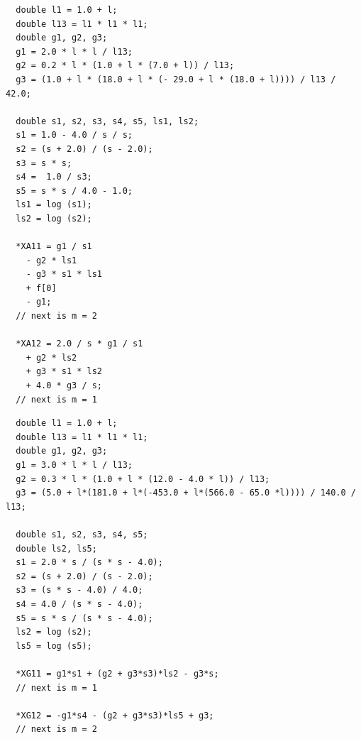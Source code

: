 \documentclass[12pt]{article}
\begin{document}
\begin{minipage}[cbt]{0.5\textwidth}
{\tiny
\begin{verbatim}
  double l1 = 1.0 + l;
  double l13 = l1 * l1 * l1;
  double g1, g2, g3;
  g1 = 2.0 * l * l / l13;
  g2 = 0.2 * l * (1.0 + l * (7.0 + l)) / l13;
  g3 = (1.0 + l * (18.0 + l * (- 29.0 + l * (18.0 + l)))) / l13 / 42.0;

  double s1, s2, s3, s4, s5, ls1, ls2;
  s1 = 1.0 - 4.0 / s / s;
  s2 = (s + 2.0) / (s - 2.0);
  s3 = s * s;
  s4 =  1.0 / s3;
  s5 = s * s / 4.0 - 1.0;
  ls1 = log (s1);
  ls2 = log (s2);

  *XA11 = g1 / s1
    - g2 * ls1
    - g3 * s1 * ls1
    + f[0]
    - g1;
  // next is m = 2

  *XA12 = 2.0 / s * g1 / s1
    + g2 * ls2
    + g3 * s1 * ls2
    + 4.0 * g3 / s;
  // next is m = 1
\end{verbatim}
}
\end{minipage}
\begin{minipage}[cbt]{0.5\textwidth}
{\tiny
\begin{verbatim}
  double l1 = 1.0 + l;
  double l13 = l1 * l1 * l1;
  double g1, g2, g3;
  g1 = 3.0 * l * l / l13;
  g2 = 0.3 * l * (1.0 + l * (12.0 - 4.0 * l)) / l13;
  g3 = (5.0 + l*(181.0 + l*(-453.0 + l*(566.0 - 65.0 *l)))) / 140.0 / l13;

  double s1, s2, s3, s4, s5;
  double ls2, ls5;
  s1 = 2.0 * s / (s * s - 4.0);
  s2 = (s + 2.0) / (s - 2.0);
  s3 = (s * s - 4.0) / 4.0;
  s4 = 4.0 / (s * s - 4.0);
  s5 = s * s / (s * s - 4.0);
  ls2 = log (s2);
  ls5 = log (s5);
  
  *XG11 = g1*s1 + (g2 + g3*s3)*ls2 - g3*s;
  // next is m = 1

  *XG12 = -g1*s4 - (g2 + g3*s3)*ls5 + g3;
  // next is m = 2
\end{verbatim}
}
\end{minipage}



\end{document}
